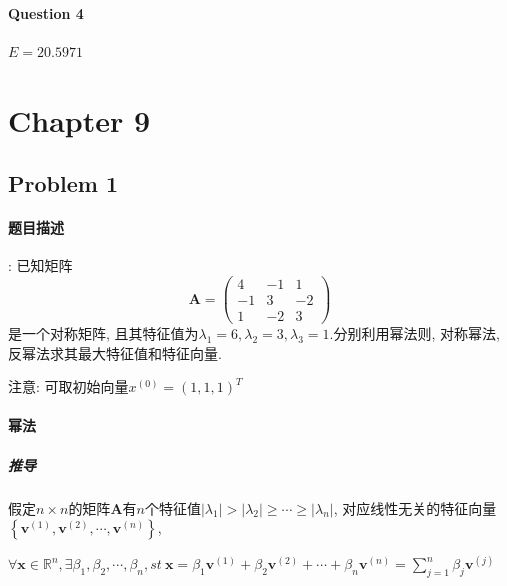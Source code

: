\documentclass{article}
\begin{document}
\begin{CJK*}{UTF8}{song}
			\paragraph{Question 4}
			 $E=20.5971$
	\section{Chapter 9}
		\subsection{Problem 1}
			\paragraph{题目描述}:
				已知矩阵
				$$ \mathbf{A} = 
					\left(
						\begin{matrix}
							4 & -1 & 1 \\
							-1 &  3 & -2 \\
							1 &  -2 & 3
						\end{matrix}
					\right)$$
				是一个对称矩阵, 且其特征值为$\lambda_1=6,\lambda_2=3,\lambda_3=1$.分别利用幂法则, 对称幂法, 反幂法求其最大特征值和特征向量.
			
				注意: 可取初始向量$x^{\left(0\right)} = \left(1,1,1\right)^T$%
			
			\paragraph{幂法}
				\subparagraph{推导}
					假定$n\times n$的矩阵$\mathbf{A}$有$n$个特征值$\left|\lambda_1\right|> \left|\lambda_2\right| \geq \cdots \geq \left|\lambda_n\right|$, 对应线性无关的特征向量$\left\{\mathbf{v}^{\left(1\right)}, \mathbf{v}^{\left(2\right)},\cdots,\mathbf{v}^{\left(n\right)} \right\}$,
					
					$\forall \mathbf{x} \in \mathbb{R}^n, \exists \beta_1,\beta_2,\cdots,\beta_n, st \ \mathbf{x} = \beta_1 \mathbf{v}^{\left(1\right)} + \beta_2 \mathbf{v}^{\left(2\right)} + \cdots + \beta_n \mathbf{v}^{\left(n\right)} = \sum_{j=1}^{n} \beta_j \mathbf{v}^{\left(j\right)}$
					

\end{CJK*}
\end{document}
